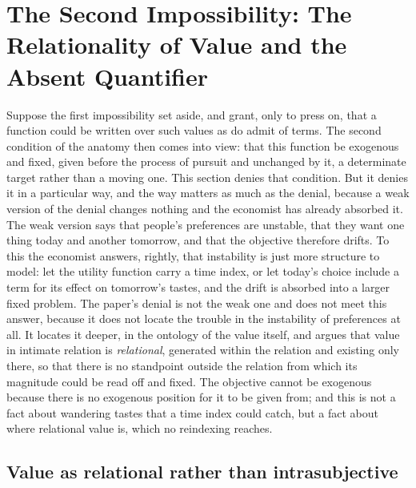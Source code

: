 \section{The Second Impossibility: The Relationality of Value and the Absent Quantifier}
\label{p25:sec:relationality}

\noindent
Suppose the first impossibility set aside, and grant, only to press on, that a function could be written over such values as do admit of terms. The second condition of the anatomy then comes into view: that this function be exogenous and fixed, given before the process of pursuit and unchanged by it, a determinate target rather than a moving one. This section denies that condition. But it denies it in a particular way, and the way matters as much as the denial, because a weak version of the denial changes nothing and the economist has already absorbed it. The weak version says that people's preferences are unstable, that they want one thing today and another tomorrow, and that the objective therefore drifts. To this the economist answers, rightly, that instability is just more structure to model: let the utility function carry a time index, or let today's choice include a term for its effect on tomorrow's tastes, and the drift is absorbed into a larger fixed problem. The paper's denial is not the weak one and does not meet this answer, because it does not locate the trouble in the instability of preferences at all. It locates it deeper, in the ontology of the value itself, and argues that value in intimate relation is \emph{relational}, generated within the relation and existing only there, so that there is no standpoint outside the relation from which its magnitude could be read off and fixed. The objective cannot be exogenous because there is no exogenous position for it to be given from; and this is not a fact about wandering tastes that a time index could catch, but a fact about where relational value is, which no reindexing reaches.

\subsection*{Value as relational rather than intrasubjective}

